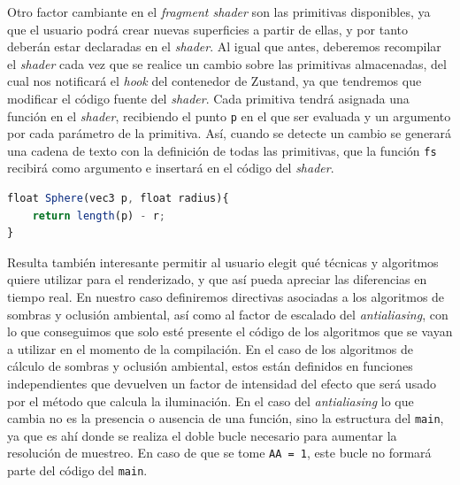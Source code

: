 Otro factor cambiante en el \textit{fragment shader} son las primitivas disponibles, ya que el usuario podrá crear nuevas superficies a partir de ellas, y por tanto deberán estar declaradas en el \textit{shader}. Al igual que antes, deberemos recompilar el \textit{shader} cada vez que se realice un cambio sobre las primitivas almacenadas, del cual nos notificará el \textit{hook} del contenedor de Zustand, ya que tendremos que modificar el código fuente del \textit{shader}. Cada primitiva tendrá asignada una función en el \textit{shader}, recibiendo el punto \texttt{p} en el que ser evaluada y un argumento por cada parámetro de la primitiva. Así, cuando se detecte un cambio se generará una cadena de texto con la definición de todas las primitivas, que la función \texttt{fs} recibirá como argumento e insertará en el código del \textit{shader}.\newline
\begin{lstlisting}[language=JavaScript, caption=Ejemplo de declaración de primitiva]
float Sphere(vec3 p, float radius){
    return length(p) - r;
}
\end{lstlisting}
Resulta también interesante permitir al usuario elegit qué técnicas y algoritmos quiere utilizar para el renderizado, y que así pueda apreciar las diferencias en tiempo real. En nuestro caso definiremos directivas asociadas a los algoritmos de sombras y oclusión ambiental, así como al factor de escalado del \textit{antialiasing}, con lo que conseguimos que solo esté presente el código de los algoritmos que se vayan a utilizar en el momento de la compilación. En el caso de los algoritmos de cálculo de sombras y oclusión ambiental, estos están definidos en funciones independientes que devuelven un factor de intensidad del efecto que será usado por el método que calcula la iluminación. En el caso del \textit{antialiasing} lo que cambia no es la presencia o ausencia de una función, sino la estructura del \texttt{main}, ya que es ahí donde se realiza el doble bucle necesario para aumentar la resolución de muestreo. En caso de que se tome \texttt{AA = 1}, este bucle no formará parte del código del \texttt{main}.\newline

